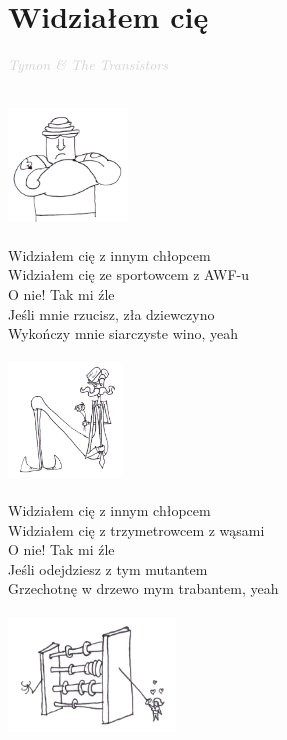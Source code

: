\documentclass[a5paper, 10pt]{book}
\begin{document}
\section{Widziałem cię}\textcolor{lightgray}{\textit{Tymon \& The Transistors
}}\\
\begin{minipage}[t]{0.9\textwidth}
  ~\\
  \includegraphics[height=3cm, right]{widzialem_cie_1.png}\vspace*{-3.1cm}\\
~\\
Widziałem cię z innym chłopcem\\
Widziałem cię ze sportowcem z AWF-u\\
O nie! Tak mi źle\\
Jeśli mnie rzucisz, zła dziewczyno\\
Wykończy mnie siarczyste wino, yeah\\
\\
\includegraphics[height=3cm, right]{widzialem_cie_2.png}\vspace*{-3.1cm}\\
\\
Widziałem cię z innym chłopcem\\
Widziałem cię z trzymetrowcem z wąsami\\
O nie! Tak mi źle\\
Jeśli odejdziesz z tym mutantem\\
Grzechotnę w drzewo mym trabantem, yeah\\
\\
\includegraphics[height=3cm, right]{widzialem_cie_3.png}\vspace*{-3.1cm}\\

\end{minipage}
\end{document}
